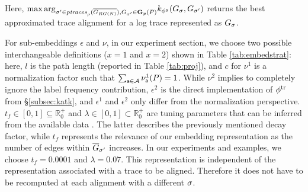 %
Here, ${\max\arg}_{\nonlogtrace\in \WCal{\pmin}{n}, G_\nonlogtrace\in\TBf{p}{n}(P)} k_{\gorgembed}(G_\logtrace, G_{\nonlogtrace})$ returns the best approximated trace alignment for a log trace represented as $G_{\logtrace}$. %
%
\begin{table}[!t]
	\caption{Different sub-embedding definitions ($\epsilon^1$, $\epsilon^2$, $\nu^1$, and $\nu^2$) for $\gorgembed$.}\label{tab:embedstrat}
	\centering
\end{table}
%
For sub-embeddings $\epsilon$ and $\nu$, {in our experiment section}, we choose two possible interchangeable definitions ($x=1$ and $x=2$) shown in Table \ref{tab:embedstrat}: here, $l$ is the path length (reported in Table \ref{tab:proj}), and $c$ for $\nu^1$ is a normalization factor such that $\sum_{\const{a}\in\mathcal{A}}\nu^1_\const{a}(P)=1$. While $\nu^2$ implies to completely ignore the label frequency contribution, $\epsilon^2$ is the direct implementation of $\trembed$ from \S\ref{subsec:katk}, and $\epsilon^1$ and $\epsilon^2$ only differ from the normalization perspective. %
%
$t_f\in [0,1]\subseteq\mathbb{R}^+_{0}$ and $\lambda\in [0,1]\subset\mathbb{R}^+_{0}$ are tuning parameters that can be
inferred from the available data \cite{DriessensRG06}. The latter describes the previously mentioned decay factor, while $t_f$
represents the relevance of our embedding representation as the number of edges within $\closed{G}_\nonlogtrace$ increases. In our experiments and
examples, we choose $t_f=0.0001$ and $\lambda=0.07$.
This representation is independent of the representation associated with a trace to be aligned. Therefore it does not have to be recomputed at each alignment with a different $\logtrace$.



